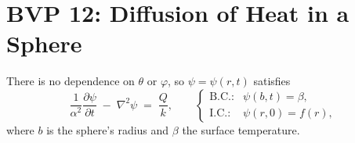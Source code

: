 \documentclass{report}
\begin{document}
\section{BVP 12: Diffusion of Heat in a Sphere}


There is no dependence on \(\theta\) or \(\varphi\), so \(\psi = \psi(r,t)\) satisfies
\[
\frac{1}{\alpha^{2}}\frac{\partial \psi}{\partial t}\;-\;\nabla^{2}\psi \;=\; \frac{Q}{k},
\qquad
\begin{cases}
\text{B.C.:}& \psi(b,t) = \beta,\\
\text{I.C.:}& \psi(r,0) = f(r),
\end{cases}
\]
where \(b\) is the sphere’s radius and \(\beta\) the surface temperature.

\begin{center}
    


\begin{tikzpicture}[x=0.75pt,y=0.75pt,yscale=-1,xscale=1]


\end{tikzpicture}
\end{center}
\end{document}
